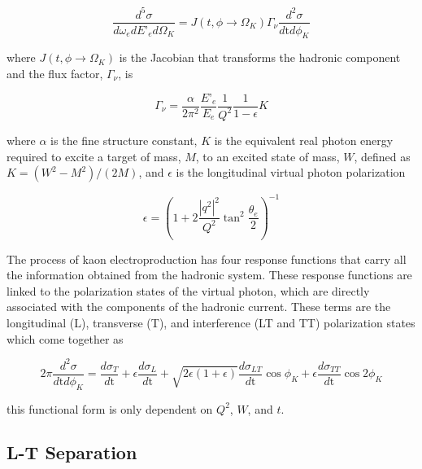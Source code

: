 \documentclass[
]{report}
\begin{document}
\begin{equation} 
    \frac{d^5\sigma}{d\omega_{e}dE’_{e}d\Omega_{K}}=J(t,\phi\rightarrow\Omega_{K})\Gamma_{\nu}\frac{d^2\sigma}{d\mathrm{t}d\phi_{K}}
  \label{eq:k_unsep_xsect} 
\end{equation}

\noindent where \(J(t,\phi\rightarrow\Omega_{K})\) is the Jacobian that
transforms the hadronic component and the flux factor, \(\Gamma_{\nu}\),
is

\begin{equation} 
    \Gamma_{\nu}=\frac{\alpha}{2\pi^2}\frac{E’_e}{E_e}\frac{1}{Q^2}\frac{1}{1-\epsilon}K
  \label{eq:photon_gamma} 
\end{equation}

\noindent where \(\alpha\) is the fine structure constant, \(K\) is the
equivalent real photon energy required to excite a target of mass,
\(M\), to an excited state of mass, \(W\), defined as
\(K=(W^2-M^2)/(2M)\), and \(\epsilon\) is the longitudinal virtual
photon polarization

\begin{equation} 
    \epsilon=(1+2\frac{|q^2|^2}{Q^2}\tan^2{\frac{\theta_e}{2}})^{-1}
  \label{eq:photon_eps} 
\end{equation}

The process of kaon electroproduction has four response functions that
carry all the information obtained from the hadronic system. These
response functions are linked to the polarization states of the virtual
photon, which are directly associated with the components of the
hadronic current. These terms are the longitudinal (L), transverse (T),
and interference (LT and TT) polarization states which come together as

\begin{equation} 
    2\pi\frac{d^2\sigma}{d\mathrm{t}d\phi_{K}}=\frac{d\sigma_T}{d\mathrm{t}}+\epsilon\frac{d\sigma_L}{d\mathrm{t}}+\sqrt{2\epsilon(1+\epsilon)}\frac{d\sigma_{LT}}{d\mathrm{t}}\cos{\phi_{K}}+\epsilon\frac{d\sigma_{TT}}{d\mathrm{t}}\cos{2\phi_{K}}
  \label{eq:unsep_xsect} 
\end{equation}

\noindent this functional form is only dependent on \(Q^2\), \(W\), and
\(t\).

\hypertarget{l-t-separation}{%
\subsection{L-T Separation}\label{l-t-separation}}
\end{document}
